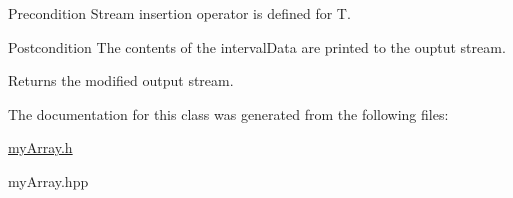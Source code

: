 \begin{DoxyPrecond}{Precondition}
Stream insertion operator is defined for {\ttfamily T}. 
\end{DoxyPrecond}
\begin{DoxyPostcond}{Postcondition}
The contents of the interval\+Data are printed to the ouptut stream. 
\end{DoxyPostcond}
\begin{DoxyReturn}{Returns}
the modified output stream. 
\end{DoxyReturn}


The documentation for this class was generated from the following files\+:\begin{DoxyCompactItemize}
\item 
\hyperlink{myArray_8h}{my\+Array.\+h}\item 
my\+Array.\+hpp\end{DoxyCompactItemize}
